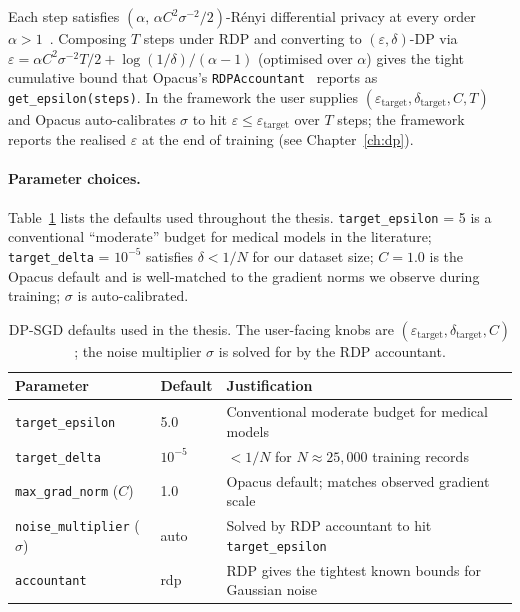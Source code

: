 \documentclass[11pt,a4paper]{report}
\begin{document}
Each step satisfies $(\alpha,\, \alpha C^2 \sigma^{-2}/2)$-Rényi differential
privacy at every order $\alpha > 1$~\cite{mironov2017rdp}. Composing $T$
steps under RDP and converting to $(\varepsilon, \delta)$-DP via
$\varepsilon = \alpha C^2 \sigma^{-2} T / 2 + \log(1/\delta)/(\alpha - 1)$
(optimised over $\alpha$) gives the tight cumulative bound that Opacus's
\texttt{RDPAccountant}~\cite{yousefpour2021opacus} reports as
\texttt{get\_epsilon(steps)}. In the framework the user supplies
$(\varepsilon_{\mathrm{target}}, \delta_{\mathrm{target}}, C, T)$ and Opacus
auto-calibrates $\sigma$ to hit $\varepsilon \le \varepsilon_{\mathrm{target}}$
over $T$ steps; the framework reports the realised $\varepsilon$ at the end
of training (see Chapter~\ref{ch:dp}).

\paragraph{Parameter choices.} Table~\ref{tab:dp-defaults} lists the
defaults used throughout the thesis. \texttt{target\_epsilon} = 5 is a
conventional ``moderate'' budget for medical models in the literature;
\texttt{target\_delta} = $10^{-5}$ satisfies $\delta < 1/N$ for our dataset
size; $C = 1.0$ is the Opacus default and is well-matched to the gradient
norms we observe during training; $\sigma$ is auto-calibrated.

\begin{table}[h]
  \centering
  \caption{DP-SGD defaults used in the thesis. The user-facing knobs are
  $(\varepsilon_{\mathrm{target}}, \delta_{\mathrm{target}}, C)$; the
  noise multiplier $\sigma$ is solved for by the RDP accountant.}
  \label{tab:dp-defaults}
  \begin{tabular}{lll}
    \toprule
    Parameter & Default & Justification \\
    \midrule
    \texttt{target\_epsilon}     & 5.0    & Conventional moderate budget for medical models \\
    \texttt{target\_delta}       & $10^{-5}$ & $< 1/N$ for $N \approx 25{,}000$ training records \\
    \texttt{max\_grad\_norm} ($C$) & 1.0  & Opacus default; matches observed gradient scale \\
    \texttt{noise\_multiplier} ($\sigma$) & auto & Solved by RDP accountant to hit \texttt{target\_epsilon} \\
    \texttt{accountant}          & rdp    & RDP gives the tightest known bounds for Gaussian noise \\
    \bottomrule
  \end{tabular}
\end{table}
\end{document}
